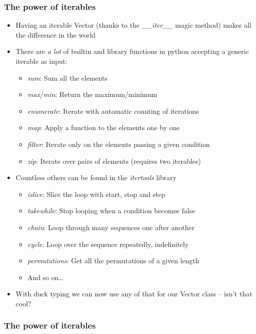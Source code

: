 \documentclass[9pt]{beamer}
\begin{document}
\begin{frame}
  \frametitle{The power of iterables}
  \begin{itemize}
    \item Having an iterable Vector (thanks to the \emph{\_\_iter\_\_} magic
          method) makes all the difference in the world
    \smallskip
    \item There are \emph{a lot} of builtin and library functions in python accepting a
          generic iterable as input:
    \begin{itemize}
      \item \emph{sum}: Sum all the elements
      \item \emph{max}/\emph{min}: Return the maximum/minimum
      \item \emph{enumerate}: Iterate with automatic counting of iterations
      \item \emph{map}: Apply a function to the elements one by one
      \item \emph{filter}: Iterate only on the elements passing a given condition
      \item \emph{zip}: Iterate over pairs of elements (requires two iterables)
    \end{itemize}
    \smallskip
    \item Countless others can be found in the \alert{\emph{itertools}} library
    \begin{itemize}
      \item \emph{islice}: Slice the loop with start, stop and step
      \item \emph{takewhile}: Stop looping when a condition becomes false
      \item \emph{chain}: Loop through many sequences one after another
      \item \emph{cycle}: Loop over the sequence repeatedly, indefinitely
      \item \emph{permutations}: Get all the permutations of a given length
      \item And so on\dots
    \end{itemize}
    \smallskip
    \item With duck typing we can now use any of that for our Vector class -- isn't that cool?
  \end{itemize}
\end{frame}


\begin{frame}
  \frametitle{The power of iterables}
  
\end{frame}
\end{document}
